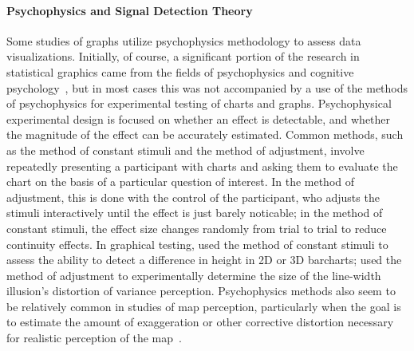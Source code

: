 \documentclass[letterpaper]{ar-1col}\usepackage[]{graphicx}\usepackage[]{color}
\begin{document}
\paragraph{Psychophysics and Signal Detection Theory} %
Some studies of graphs utilize psychophysics methodology to assess data visualizations. Initially, of course, a significant portion of the research in statistical graphics came from the fields of psychophysics and cognitive psychology~\citep{spenceVisualPsychophysicsSimple1990,teghtsoonian_judgment_1965, lewandowskyPerceptionStatisticalGraphs1989}, but in most cases this was not accompanied by a  use of the methods of psychophysics for experimental testing of charts and graphs. Psychophysical experimental design is focused on whether an effect is detectable, and whether the magnitude of the effect can be accurately estimated. Common methods, such as the method of constant stimuli and the method of adjustment, involve repeatedly presenting a participant with charts and asking them to evaluate the chart on the basis of a particular question of interest. In the method of adjustment, this is done with the control of the participant, who adjusts the stimuli interactively until the effect is just barely noticable; in the method of constant stimuli, the effect size changes randomly from trial to trial to reduce continuity effects. In graphical testing, \citet{hughesJustNoticeableDifferences2001} used the method of constant stimuli to assess the ability to detect a difference in height in 2D or 3D barcharts; \citet{vanderplas_signs_2015} used the method of adjustment to experimentally determine the size of the line-width illusion's distortion of variance perception. Psychophysics methods also seem to be relatively common in studies of map perception, particularly when the goal is to estimate the amount of exaggeration or other corrective distortion necessary for realistic perception of the map~\citep[for an overview of relevant cartography studies, see][]{brandesPresentStatePerceptual1976}.
\end{document}
